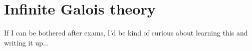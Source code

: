 \appendix
\chapter{Infinite Galois theory}

If I can be bothered after exams, I'd be kind of curious about learning this and writing it up...
